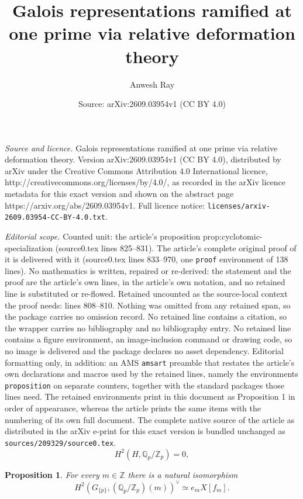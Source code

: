 \documentclass[10pt,a4paper]{amsart}
\title{Galois representations ramified at one prime via relative deformation theory}
\author{Anwesh Ray}
\date{Source: arXiv:2609.03954v1 (CC BY 4.0)}
\newtheorem{proposition}{Proposition}
\newcommand{\Qp}{\mathbb Q_p}
\newcommand{\Z}{\mathbb Z}
\newcommand{\Zp}{\mathbb Z_p}
\begin{document}
\maketitle

\noindent\emph{Source and licence.} Galois representations ramified at one prime via relative deformation theory. Version arXiv:2609.03954v1 (CC BY 4.0), distributed by arXiv under the Creative Commons Attribution 4.0 International licence, http://creativecommons.org/licenses/by/4.0/, as recorded in the arXiv licence metadata for this exact version and shown on the abstract page https://arxiv.org/abs/2609.03954v1. Full licence notice: \texttt{licenses/arxiv-2609.03954-CC-BY-4.0.txt}.\par\smallskip

\noindent\textit{Editorial scope.} Counted unit: the article's proposition prop:cyclotomic-specialization (source0.tex lines 825--831). The article's complete original proof of it is delivered with it (source0.tex lines 833--970, one \texttt{proof} environment of 138 lines). No mathematics is written, repaired or re-derived: the statement and the proof are the article's own lines, in the article's own notation, and no retained line is substituted or re-flowed.  Retained uncounted as the source-local context the proof needs: lines 808--810.  Nothing was omitted from any retained span, so the package carries no omission record.  No retained line contains a citation, so the wrapper carries no bibliography and no bibliography entry.  No retained line contains a figure environment, an image-inclusion command or drawing code, so no image is delivered and the package declares no asset dependency.  Editorial formatting only, in addition: an AMS \texttt{amsart} preamble that restates the article's own declarations and macros used by the retained lines, namely the environments \texttt{proposition} on separate counters, together with the standard packages those lines need.  The retained environments print in this document as Proposition 1 in order of appearance, whereas the article prints the same items with the numbering of its own full document.  The complete native source of the article as distributed in the arXiv e-print for this exact version is bundled unchanged as \texttt{sources/209329/source0.tex}.
\begin{equation}\label{eq:weak-leopoldt-H}
 H^2(H,\Qp/\Zp)=0,
\end{equation}

\begin{proposition}\label{prop:cyclotomic-specialization}
For every $m\in\Z$ there is a natural isomorphism
\begin{equation}\label{eq:H2-specialization}
 H^2\!\left(G_{\{p\}},(\Qp/\Zp)(m)\right)^\vee
 \simeq e_mX[f_m].
\end{equation}
\end{proposition}
\end{document}
